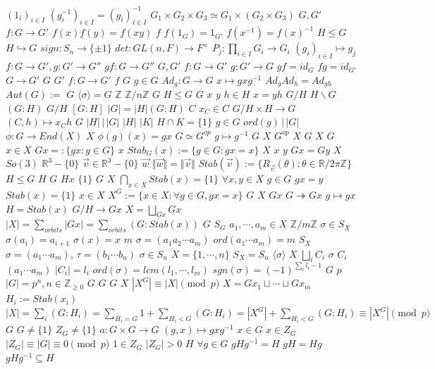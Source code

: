 \documentclass{article}
\begin{document}
$(1_i)_{i \in I}$
$(g_i^{-1})_{i \in I}=(g_i)_{i \in I}^{-1}$
$G_1 \times G_2 \times G_3 \simeq G_1 \times (G_2 \times G_3)$
$G,G'$
$f:G \rightarrow G'$
$f(x)f(y)=f(xy)$
$f$
$f(1_G)=1_{G'}$
$f(x^{-1})=f(x)^{-1}$
$H \leq G$
$H \hookrightarrow G$
$sign:S_n \rightarrow \{\pm 1\}$
$det:GL(n,F) \rightarrow F^{\times}$
$P_j:\prod_{i \in I}G_i \rightarrow G_i$
$(g_i)_{i \in I} \mapsto g_j$
$f:G \rightarrow G',g:G' \rightarrow G''$
$gf:G \rightarrow G''$
$G,G'$
$f:G \rightarrow G'$
$g:G' \rightarrow G$
$gf=id_G$
$fg=id_{G'}$
$G \rightarrow G'$
$G$
$G'$
$f:G \rightarrow G'$
$f$
$G$
$g \in G$
$Ad_g:G \rightarrow G$
$x \mapsto gxg^{-1}$
$Ad_gAd_h=Ad_{gh}$
$Aut(G):=$
$G$
$\langle \sigma \rangle=G$
$\mathbb{Z}$
$\mathbb{Z}/n\mathbb{Z}$
$G$
$H \leq G$
$G$
$x$
$y$
$h \in H$
$x=yh$
$G/H$
$H \backslash G$
$(G:H)$
$G/H$
$[G:H]$
$|G|=|H|(G:H)$
$C$
$x_C \in C$
$G/H \times H \rightarrow G$
$(C,h) \mapsto x_Ch$
$G$
$|H|\,|\, |G|$
$|H|$
$|K|$
$H \cap K=\{1\}$
$g \in G$
$ord(g)\,|\,|G|$
$\phi:G \rightarrow End(X)$
$X$
$\phi(g)(x)=gx$
$G \simeq G^{op}$
$g \mapsto g^{-1}$
$G$
$X$
$G^{op}$
$X$
$G$
$X$
$G$
$x \in X$
$Gx=:\{gx:g \in G\}$
$x$
$Stab_G(x):=\{g \in G:gx=x\}$
$X$
$x$
$y$
$Gx=Gy$
$X$
$So(3)$
$\mathbb{R}^3-\{0\}$
$\vec{v} \in \mathbb{R}^3-\{0\}$
$\vec{w}$
$\Vert \vec{w} \Vert=\Vert \vec v \Vert$
$Stab(\vec{v}):=\{R_{\vec{v}}(\theta):\theta \in \mathbb{R}/2\pi\mathbb{Z}\}$
$H \leq G$
$H$
$G$
$Hx$
$\{1\}$
$G$
$X$
$\bigcap_{x \in X} Stab(x)=\{1\}$
$\forall x,y \in X$
$g \in G$
$gx=y$
$Stab(x)=\{1\}$
$x \in X$
$X^G:=\{x \in X:\forall g \in G,gx=x\}$
$G$
$X$
$Gx$
$G \twoheadrightarrow Gx$
$g \mapsto gx$
$H=Stab(x)$
$G/H \rightarrow Gx$
$X=\bigsqcup_{Gx}Gx$
$|X|=\sum_{orbits}|Gx|=\sum_{orbits}(G:Stab(x))$
$G$
$S_G$
$a_1,\cdots,a_m \in X$
$\mathbb{Z}/m\mathbb{Z}$
$\sigma \in S_X$
$\sigma(a_i)=a_{i+1}$
$\sigma(x)=x$
$m$
$\sigma=(a_1a_2\cdots a_m)$
$ord(a_1\cdots a_m)=m$
$S_X$
$\sigma=(a_1\cdots a_m),\,\tau=(b_1\cdots b_n)$
$\sigma \in S_n$
$X=\{1,\cdots,n\}$
$S_X=S_n$
$\langle \sigma \rangle$
$X$
$\bigsqcup_iC_i$
$\sigma$
$C_i$
$(a_1\cdots a_m)$
$|C_i|=l_i$
$ord(\sigma)=lcm(l_1,\cdots,l_m)$
$sgn(\sigma)=(-1)^{\sum_{i}l_i-1}$
$G$
$p$
$|G|=p^n,n \in \mathbb{Z}_{\geq 0}$
$G$
$G$
$G$
$X$
$|X^G| \equiv |X| \pmod{p}$
$X=Gx_1 \sqcup \cdots \sqcup Gx_m$
$H_i:=Stab(x_i)$
$|X|=\sum_i(G:H_i)=\sum_{H_i=G}1+\sum_{H_i<G}(G:H_i)=|X^G|+\sum_{H_i<G}(G:H_i) \equiv |X^G| \pmod{p}$
$G$
$G \neq \{1\}$
$Z_G \neq \{1\}$
$a:G \times G \rightarrow G$
$(g,x) \mapsto gxg^{-1}$
$x \in G$
$x \in Z_G$
$|Z_G| \equiv |G| \equiv 0 \pmod{p}$
$1 \in Z_G$
$|Z_G|>0$
$H$
$\forall g \in G$
$gHg^{-1}=H$
$gH=Hg$
$gHg^{-1} \subseteq H$
\end{document}
